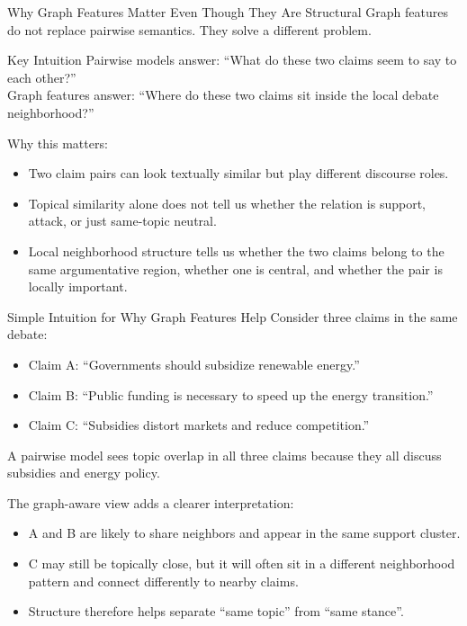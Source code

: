 \documentclass[aspectratio=169]{beamer}
\begin{document}
\begin{frame}[shrink=4]{Why Graph Features Matter Even Though They Are Structural}
Graph features do not replace pairwise semantics. They solve a different problem.

\vspace{0.2cm}
\begin{block}{Key Intuition}
Pairwise models answer: ``What do these two claims seem to say to each other?''\\
Graph features answer: ``Where do these two claims sit inside the local debate neighborhood?''
\end{block}

\vspace{0.2cm}
Why this matters:
\begin{itemize}
  \item Two claim pairs can look textually similar but play different discourse roles.
  \item Topical similarity alone does not tell us whether the relation is support, attack, or just same-topic neutral.
  \item Local neighborhood structure tells us whether the two claims belong to the same argumentative region, whether one is central, and whether the pair is locally important.
\end{itemize}
\end{frame}

\begin{frame}[shrink=3]{Simple Intuition for Why Graph Features Help}
Consider three claims in the same debate:
\begin{itemize}
  \item Claim A: ``Governments should subsidize renewable energy.''
  \item Claim B: ``Public funding is necessary to speed up the energy transition.''
  \item Claim C: ``Subsidies distort markets and reduce competition.''
\end{itemize}

A pairwise model sees topic overlap in all three claims because they all discuss subsidies and energy policy.

\vspace{0.2cm}
The graph-aware view adds a clearer interpretation:
\begin{itemize}
  \item A and B are likely to share neighbors and appear in the same support cluster.
  \item C may still be topically close, but it will often sit in a different neighborhood pattern and connect differently to nearby claims.
  \item Structure therefore helps separate ``same topic'' from ``same stance''.
\end{itemize}
\end{frame}
\end{document}
